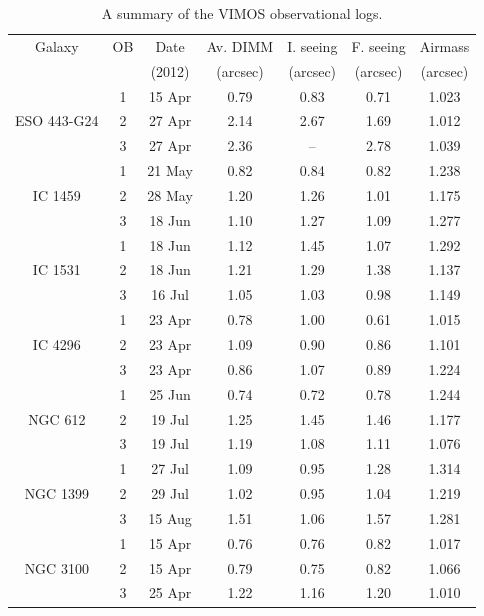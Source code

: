 		\begin{table}
			\centering
		\begin{threeparttable}
			\caption{A summary of the VIMOS observational logs.}
			\label{tab:observations} 
			\begin{tabular}{c c c c c c c}
			\hline
			\hline
				Galaxy 	& OB & Date & Av. DIMM & I. seeing & F. seeing & Airmass \\
				& & (2012) & (arcsec) & (arcsec) & (arcsec) & (arcsec) \\
			\hline
				\multirow{3}{*}{ESO 443-G24}& 1 & 15 Apr & 0.79 & 0.83 & 0.71 & 1.023 \\
				& 2 & 27 Apr & 2.14 & 2.67 & 1.69 & 1.012 \\
				& 3 & 27 Apr & 2.36 & --\tnote{a} & 2.78 & 1.039 \\
			\hline
				\multirow{3}{*}{IC 1459}& 1 & 21 May & 0.82 & 0.84 & 0.82 & 1.238 \\
				& 2 & 28 May & 1.20 & 1.26 & 1.01 & 1.175 \\
				& 3 & 18 Jun & 1.10 & 1.27 & 1.09 & 1.277 \\
			\hline
				\multirow{3}{*}{IC 1531}& 1 & 18 Jun & 1.12 & 1.45 & 1.07 & 1.292 \\
				& 2 & 18 Jun & 1.21 & 1.29 & 1.38 & 1.137 \\
				& 3 & 16 Jul & 1.05 & 1.03 & 0.98 & 1.149 \\
			\hline
				\multirow{3}{*}{IC 4296}& 1 & 23 Apr & 0.78 & 1.00 & 0.61 & 1.015 \\
				& 2 & 23 Apr & 1.09 & 0.90 & 0.86 & 1.101 \\
				& 3 & 23 Apr & 0.86 & 1.07 & 0.89 & 1.224 \\
			\hline
				\multirow{3}{*}{NGC 612}& 1 & 25 Jun & 0.74 & 0.72 & 0.78 & 1.244 \\
				& 2 & 19 Jul & 1.25 & 1.45 & 1.46 & 1.177 \\
				& 3 & 19 Jul & 1.19 & 1.08 & 1.11 & 1.076 \\
			\hline
				\multirow{3}{*}{NGC 1399}& 1 & 27 Jul & 1.09 & 0.95 & 1.28 & 1.314 \\
				& 2 & 29 Jul & 1.02 & 0.95 & 1.04 & 1.219 \\
				& 3 & 15 Aug & 1.51 & 1.06 & 1.57 & 1.281 \\
			\hline
				\multirow{3}{*}{NGC 3100}& 1 & 15 Apr & 0.76 & 0.76 & 0.82 & 1.017 \\
				& 2 & 15 Apr & 0.79 & 0.75 & 0.82 & 1.066 \\
				& 3 & 25 Apr & 1.22 & 1.16 & 1.20 & 1.010 \\

\end{tabular}
\end{threeparttable}
\end{table}

